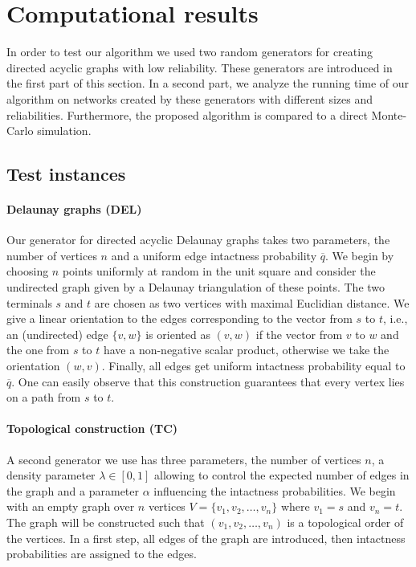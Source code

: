 \documentclass{article}
\begin{document}
\section{Computational results}\label{sec:computational_results}

In order to test our algorithm we used two random generators for
creating directed acyclic graphs with low reliability. These generators are introduced in
the first part of this section. In a second part, we analyze the
running time of our algorithm on networks created by these
generators with different sizes and reliabilities.
Furthermore, the proposed algorithm is compared to a
direct \mbox{Monte-Carlo} simulation.

\subsection{Test instances}


\paragraph{Delaunay graphs (DEL)}

Our generator for directed acyclic Delaunay graphs takes two parameters, the number of
vertices $n$ and a uniform edge intactness probability $\overline{q}$.
We begin by choosing $n$ points uniformly at random in the unit square and consider the
undirected graph given by a Delaunay triangulation of these points. The two
terminals $s$ and $t$ are chosen as two vertices with maximal Euclidian
distance. We give a linear orientation to the edges corresponding to
the vector from $s$ to $t$, i.e., an (undirected) edge $\{v,w\}$ is oriented
as $(v,w)$ if the vector from $v$ to $w$ and the one from $s$ to $t$ have
a \mbox{non-negative} scalar product, otherwise we take the orientation $(w,v)$.
Finally, all edges get uniform intactness probability equal to $\overline{q}$.
One can easily observe that this construction guarantees that every vertex lies
on a path from $s$ to $t$.



\paragraph{Topological construction (TC)}

A second generator we use has three parameters, the number of vertices
$n$, a density parameter $\lambda\in[0,1]$ allowing to control the
expected number of edges in the graph and a parameter $\alpha$ influencing
the intactness probabilities. We begin with an empty
graph over $n$ vertices $V=\{v_1,v_2,\dots,v_n\}$ where $v_1=s$ and $v_n=t$.
The graph will be constructed such that $(v_1,v_2,\dots,v_n)$ is a topological
order of the vertices. In a first step, all edges of the graph are introduced,
then intactness probabilities are assigned to the edges.
\end{document}
